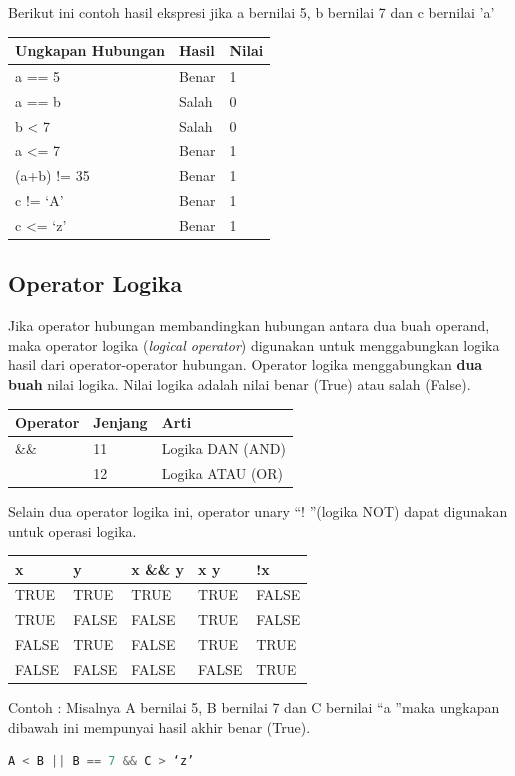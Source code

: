 Berikut ini contoh hasil ekspresi jika a bernilai 5, b bernilai 7 dan c
bernilai 'a'

\begin{longtable}[]{@{}lll@{}}
\toprule
Ungkapan Hubungan & Hasil & Nilai\tabularnewline
\midrule
\endhead
a == 5 & Benar & 1\tabularnewline
a == b & Salah & 0\tabularnewline
b \textless{} 7 & Salah & 0\tabularnewline
a \textless{}= 7 & Benar & 1\tabularnewline
(a+b) != 35 & Benar & 1\tabularnewline
c != `A' & Benar & 1\tabularnewline
c \textless{}= `z' & Benar & 1\tabularnewline
\bottomrule
\end{longtable}

\subsection{Operator Logika}\label{f-operator-logika}

Jika operator hubungan membandingkan hubungan antara dua buah operand,
maka operator logika (\emph{logical operator}) digunakan untuk
menggabungkan logika hasil dari operator-operator hubungan. Operator
logika menggabungkan \textbf{dua buah} nilai logika. Nilai logika adalah
nilai benar (True) atau salah (False).

\begin{longtable}[]{@{}lll@{}}
\toprule
Operator & Jenjang & Arti\tabularnewline
\midrule
\endhead
\&\& & 11 & Logika DAN (AND)\tabularnewline
\texttt{\textbar{}\textbar{}} & 12 & Logika ATAU (OR)\tabularnewline
\bottomrule
\end{longtable}

Selain dua operator logika ini, operator unary \textquotedblleft ! \textquotedblright (logika NOT) dapat
digunakan untuk operasi logika.

\begin{longtable}[]{@{}lllll@{}}
\toprule
x & y & x \&\& y & x \texttt{\textbar{}\textbar{}} y & !x\tabularnewline
\midrule
\endhead
TRUE & TRUE & TRUE & TRUE & FALSE\tabularnewline
TRUE & FALSE & FALSE & TRUE & FALSE\tabularnewline
FALSE & TRUE & FALSE & TRUE & TRUE\tabularnewline
FALSE & FALSE & FALSE & FALSE & TRUE\tabularnewline
\bottomrule
\end{longtable}

Contoh : Misalnya A bernilai 5, B bernilai 7 dan C bernilai \textquotedblleft a \textquotedblright maka
ungkapan dibawah ini mempunyai hasil akhir benar (True).

\begin{lstlisting}[language=c++, numbers=none]
A < B || B == 7 && C > ‘z’
\end{lstlisting}

